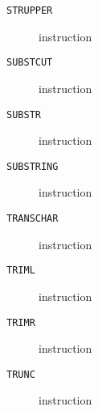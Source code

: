 \clearpage
\begin{description}
\item[\texttt{STRUPPER}] instruction\\

\end{description}
\clearpage
\begin{description}
\item[\texttt{SUBSTCUT}] instruction\\

\end{description}
\clearpage
\begin{description}
\item[\texttt{SUBSTR}] instruction\\

\end{description}
\clearpage
\begin{description}
\item[\texttt{SUBSTRING}] instruction\\

\end{description}
\clearpage
\begin{description}
\item[\texttt{TRANSCHAR}] instruction\\

\end{description}
\clearpage
\begin{description}
\item[\texttt{TRIML}] instruction\\

\end{description}
\clearpage
\begin{description}
\item[\texttt{TRIMR}] instruction\\

\end{description}
\clearpage
\begin{description}
\item[\texttt{TRUNC}] instruction\\

\end{description}
\clearpage
